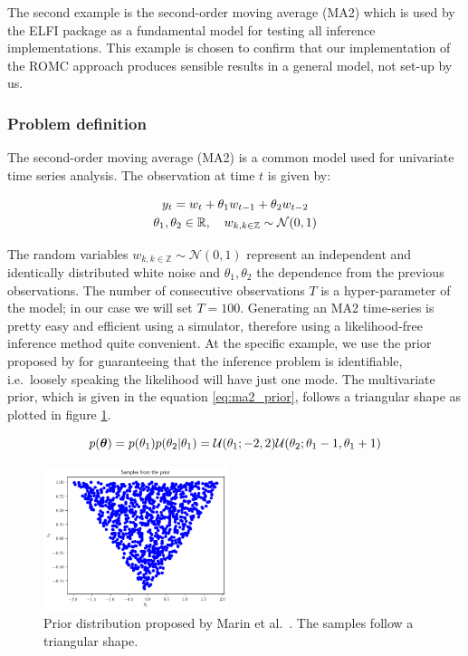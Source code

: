 The second example is the second-order moving average (MA2) which is
used by the ELFI package as a fundamental model for testing all
inference implementations. This example is chosen to confirm that our
implementation of the ROMC approach produces sensible results in a
general model, not set-up by us.

\subsubsection*{Problem definition}

The second-order moving average (MA2) is a common model used for
univariate time series analysis. The observation at time $t$ is given by:

\begin{gather} \label{eq:ma2}
y_t = w_t + \theta_1 w_{t-1} + \theta_2 w_{t-2}\\
\theta_1, \theta_2 \in \mathbb{R}, \quad  w_{k, k \in \mathbb{Z}} \sim \mathcal{N}(0,1)
\end{gather}

\noindent
The random variables $w_{k, k \in \mathbb{Z}} \sim \mathcal{N}(0,1)$
represent an independent and identically distributed white noise and
$\theta_1, \theta_2$ the dependence from the previous
observations. The number of consecutive observations $T$ is a
hyper-parameter of the model; in our case we will set
$T=100$. Generating an MA2 time-series is pretty easy and efficient
using a simulator, therefore using a likelihood-free inference method
quite convenient. At the specific example, we use the prior proposed
by \autocite{Marin2012} for guaranteeing that the inference problem is
identifiable, i.e.\ loosely speaking the likelihood will have just one
mode. The multivariate prior, which is given in the equation
\eqref{eq:ma2_prior}, follows a triangular shape as plotted in figure
\ref{fig:ma2_1}.

\begin{equation} \label{eq:ma2_prior}
p(\boldsymbol{\theta}) = p(\theta_1)p(\theta_2|\theta_1)
= \mathcal{U}(\theta_1;-2,2)\mathcal{U}(\theta_2;\theta_1-1, \theta_1+1)
\end{equation}

\begin{figure}[h]
    \begin{center}
      \includegraphics[width=0.48\textwidth]{./Thesis/images/chapter4/mae2_prior_samples.png}
    \end{center}
    \caption{Prior distribution proposed by Marin et al.\
      \cite{Marin2012}. The samples follow a triangular shape.}
  \label{fig:ma2_1}
\end{figure}

